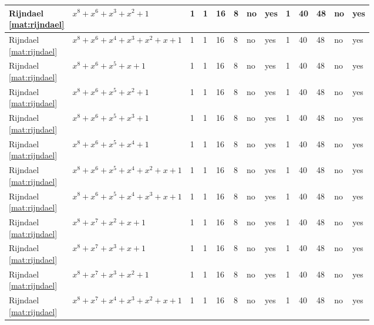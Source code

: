 \begin{tiny}
\begin{longtable}{|l|l|l|l|l|l|l|l|l|l|l|l|l|}
\shortstack{Rijndael \\ \eqref{mat:rijndael}} & $x^8 + x^6 + x^3 + x^2 + 1$ & 1 & 1 & 16 & 8 & no & yes & 1 & 40 & 48 & no & yes \\ \hline
\shortstack{Rijndael \\ \eqref{mat:rijndael}} & $x^8 + x^6 + x^4 + x^3 + x^2 + x + 1$ & 1 & 1 & 16 & 8 & no & yes & 1 & 40 & 48 & no & yes \\ \hline
\shortstack{Rijndael \\ \eqref{mat:rijndael}} & $x^8 + x^6 + x^5 + x + 1$ & 1 & 1 & 16 & 8 & no & yes & 1 & 40 & 48 & no & yes \\ \hline
\shortstack{Rijndael \\ \eqref{mat:rijndael}} & $x^8 + x^6 + x^5 + x^2 + 1$ & 1 & 1 & 16 & 8 & no & yes & 1 & 40 & 48 & no & yes \\ \hline
\shortstack{Rijndael \\ \eqref{mat:rijndael}} & $x^8 + x^6 + x^5 + x^3 + 1$ & 1 & 1 & 16 & 8 & no & yes & 1 & 40 & 48 & no & yes \\ \hline
\shortstack{Rijndael \\ \eqref{mat:rijndael}} & $x^8 + x^6 + x^5 + x^4 + 1$ & 1 & 1 & 16 & 8 & no & yes & 1 & 40 & 48 & no & yes \\ \hline
\shortstack{Rijndael \\ \eqref{mat:rijndael}} & $x^8 + x^6 + x^5 + x^4 + x^2 + x + 1$ & 1 & 1 & 16 & 8 & no & yes & 1 & 40 & 48 & no & yes \\ \hline
\shortstack{Rijndael \\ \eqref{mat:rijndael}} & $x^8 + x^6 + x^5 + x^4 + x^3 + x + 1$ & 1 & 1 & 16 & 8 & no & yes & 1 & 40 & 48 & no & yes \\ \hline
\shortstack{Rijndael \\ \eqref{mat:rijndael}} & $x^8 + x^7 + x^2 + x + 1$ & 1 & 1 & 16 & 8 & no & yes & 1 & 40 & 48 & no & yes \\ \hline
\shortstack{Rijndael \\ \eqref{mat:rijndael}} & $x^8 + x^7 + x^3 + x + 1$ & 1 & 1 & 16 & 8 & no & yes & 1 & 40 & 48 & no & yes \\ \hline
\shortstack{Rijndael \\ \eqref{mat:rijndael}} & $x^8 + x^7 + x^3 + x^2 + 1$ & 1 & 1 & 16 & 8 & no & yes & 1 & 40 & 48 & no & yes \\ \hline
\shortstack{Rijndael \\ \eqref{mat:rijndael}} & $x^8 + x^7 + x^4 + x^3 + x^2 + x + 1$ & 1 & 1 & 16 & 8 & no & yes & 1 & 40 & 48 & no & yes \\ \hline

\end{longtable}
\end{tiny}
